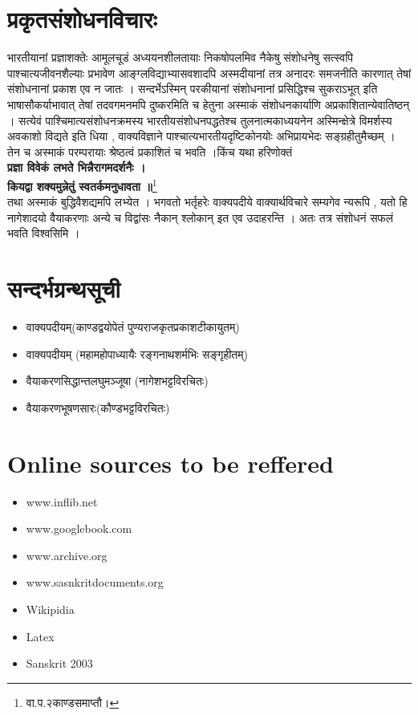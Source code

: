 \section*{प्रकृतसंशोधनविचारः}
भारतीयानां प्रज्ञाशक्तेः आमूलचूडं अध्ययनशीलतायाः निकषोपलमिव नैकेषु संशोधनेषु सत्स्वपि पाश्चात्यजीवनशैल्याः प्रभावेण आङ्ग्लविद्याभ्यासवशादपि अस्मदीयानां तत्र अनादरः समजनीति कारणात् तेषां संशोधनानां प्रकाश एव न जातः । सन्दर्भेऽस्मिन् परकीयानां संशोधनानां प्रसिद्धिश्च सुकराऽभूत्  इति भाषासौकर्याभावात् तेषां तदवगमनमपि दुष्करमिति  च हेतुना अस्माकं संशोधनकार्याणि अप्रकाशितान्येवातिष्ठन् । सत्येवं पाश्चिमात्यसंशोधनक्रमस्य भारतीयसंशोधनपद्धतेश्च तुलनात्मकाध्ययनेन अस्मिन्क्षेत्रे विमर्शस्य अवकाशो विद्यते इति धिया , वाक्यविज्ञाने पाश्चात्यभारतीयदृष्टिकोनयोः अभिप्रायभेदः सङ्ग्रहीतुमैच्छम् । तेन च अस्माकं परम्परायाः श्रेष्ठत्वं प्रकाशितं च भवति ।किंच यथा हरिणोक्तं \\{\bf प्रज्ञा विवेकं लभते भिन्नैरागमदर्शनैः ।\\ कियद्वा शक्यमुन्नेतुं स्वतर्कमनुधावता ॥}\footnote{वा.प.२काण्डसमाप्तौ।}\\ तथा अस्माकं बुद्धिवैशद्यमपि लभ्येत । भगवतो भर्तृहरेः वाक्यपदीये वाक्यार्थविचारे सम्यगेव न्यरूपि , यतो हि नागेशादयो वैयाकरणाः अन्ये च  विद्वांसः नैकान् श्लोकान् इत एव उदाहरन्ति । अतः तत्र संशोधनं सफलं भवति विश्वसिमि ।
\vspace{-15pt}
\section*{सन्दर्भग्रन्थसूची}
\begin{itemize}
\itemsep=0pt
\item वाक्यपदीयम्(काण्डद्वयोपेतं पुण्यराजकृतप्रकाशटीकायुतम्)
\item वाक्यपदीयम् (महामहोपाध्यायैः रङ्गनाथशर्मभिः सङ्गृहीतम्)
\item वैयाकरणसिद्धान्तलघुमञ्जूषा (नागेशभट्टविरचितः)
\item वैयाकरणभूषणसारः(कौण्डभट्टविरचितः)
\end{itemize}
\vspace{-15pt}
\section*{Online sources to be reffered}
\begin{itemize}
\itemsep=0pt
\item www.inflib.net
\item www.googlebook.com
\item www.archive.org
\item www.sasnkritdocuments.org
\item Wikipidia
\item Latex
\item Sanskrit 2003
\end{itemize}

